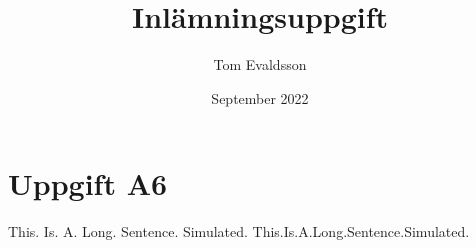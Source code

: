 \documentclass{article}
\title{Inlämningsuppgift}
\author{Tom Evaldsson}
\date{September 2022}
\begin{document}
	
	\maketitle
	
	
	\section{Uppgift A6}
	This. 
	Is. 
	A. 
	Long. 
	Sentence. 
	Simulated.
	This.Is.A.Long.Sentence.Simulated.
\end{document}
